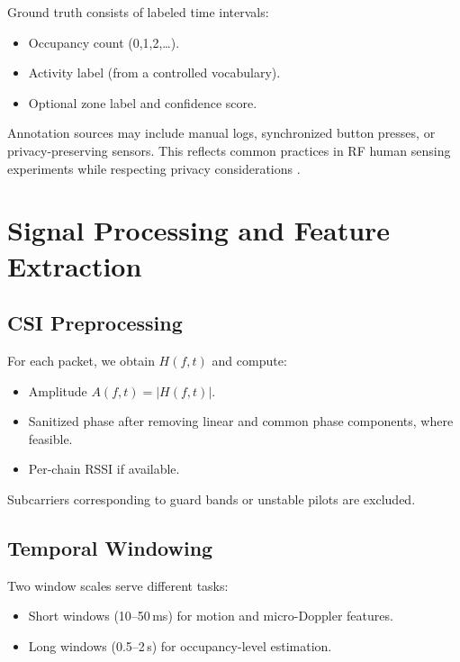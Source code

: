 \documentclass[11pt,a4paper]{article}
\begin{document}
Ground truth consists of labeled time intervals:

\begin{itemize}[leftmargin=*]
\item Occupancy count (0,1,2,\dots).
\item Activity label (from a controlled vocabulary).
\item Optional zone label and confidence score.
\end{itemize}

Annotation sources may include manual logs, synchronized button presses, or privacy-preserving sensors. This reflects common practices in RF human sensing experiments while respecting privacy considerations \cite{shahbazian2023human}.

\section{Signal Processing and Feature Extraction}

\subsection{CSI Preprocessing}

For each packet, we obtain $H(f,t)$ and compute:

\begin{itemize}[leftmargin=*]
\item Amplitude $A(f,t) = |H(f,t)|$.
\item Sanitized phase after removing linear and common phase components, where feasible.
\item Per-chain RSSI if available.
\end{itemize}

Subcarriers corresponding to guard bands or unstable pilots are excluded.

\subsection{Temporal Windowing}

Two window scales serve different tasks:

\begin{itemize}[leftmargin=*]
\item Short windows (10--50\,ms) for motion and micro-Doppler features.
\item Long windows (0.5--2\,s) for occupancy-level estimation.
\end{itemize}
\end{document}
